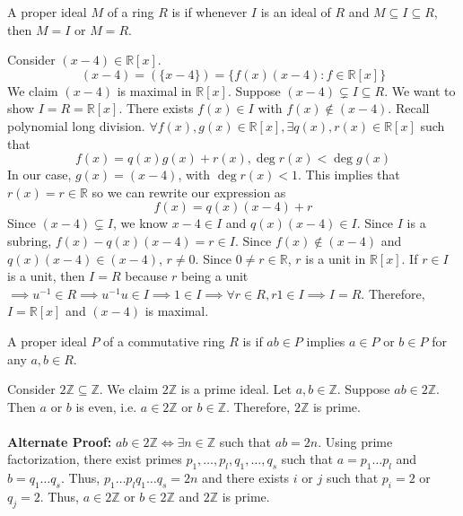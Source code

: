 \documentclass[11pt,letterpaper]{jacky}
\begin{document}
\begin{defi}
    A proper ideal $M$ of a ring $R$ is  if whenever $I$ is an ideal of $R$ and $M\subseteq I\subseteq R$, then $M=I$ or $M=R$.
\end{defi}

\begin{ex}
    Consider $(x-4)\in\mathbb{R}[x]$.
    $$(x-4)=(\{x-4\})=\{f(x)(x-4):f\in\mathbb{R}[x]\}$$
    We claim $(x-4)$ is maximal in $\mathbb{R}[x]$. Suppose $(x-4)\subsetneq I\subseteq R$. We want to show $I=R=\mathbb{R}[x]$. There exists $f(x)\in I$ with $f(x)\notin(x-4)$. Recall polynomial long division. $\forall f(x),g(x)\in\mathbb{R}[x],\exists q(x),r(x)\in\mathbb{R}[x]$ such that
    $$f(x)=q(x)g(x)+r(x),\deg r(x)<\deg g(x)$$
    In our case, $g(x)=(x-4)$, with $\deg r(x)<1$. This implies that $r(x)=r\in\mathbb{R}$ so we can rewrite our expression as
    $$f(x)=q(x)(x-4)+r$$
    Since $(x-4)\subsetneq I$, we know $x-4\in I$ and $q(x)(x-4)\in I$. Since $I$ is a subring, $f(x)-q(x)(x-4)=r\in I$. Since $f(x)\notin(x-4)$ and $q(x)(x-4)\in(x-4)$, $r\ne0$. Since $0\ne r\in\mathbb{R}$, $r$ is a unit in $\mathbb{R}[x]$. If $r\in I$ is a unit, then $I=R$ because $r$ being a unit $\implies u^{-1}\in R\implies u^{-1}u\in I\implies1\in I\implies\forall r\in R, r1\in I\implies I=R$. Therefore, $I=\mathbb{R}[x]$ and $(x-4)$ is maximal.
\end{ex}

\begin{defi}
    A proper ideal $P$ of a commutative ring $R$ is  if $ab\in P$ implies $a\in P$ or $b\in P$ for any $a,b\in R$.
\end{defi}

\begin{ex}
    Consider $2\mathbb{Z}\subseteq\mathbb{Z}$. We claim $2\mathbb{Z}$ is a prime ideal. Let $a,b\in\mathbb{Z}$. Suppose $ab\in2\mathbb{Z}$. Then $a$ or $b$ is even, i.e. $a\in2\mathbb{Z}$ or $b\in\mathbb{Z}$. Therefore, $2\mathbb{Z}$ is prime.\\\\
    \textbf{Alternate Proof:} $ab\in2\mathbb{Z}\Leftrightarrow\exists n\in\mathbb{Z}$ such that $ab=2n$. Using prime factorization, there exist primes $p_1,\ldots,p_l,q_1,\ldots,q_s$ such that $a=p_1\ldots p_l$ and $b=q_1\ldots q_s$. Thus, $p_1\ldots p_lq_1\ldots q_s=2n$ and there exists $i$ or $j$ such that $p_i=2$ or $q_j=2$. Thus, $a\in2\mathbb{Z}$ or $b\in2\mathbb{Z}$ and $2\mathbb{Z}$ is prime.
\end{ex}
\end{document}
